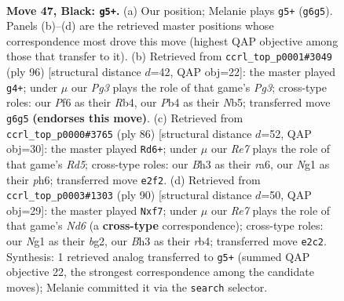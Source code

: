 \documentclass[11pt]{article}
\begin{document}
\clearpage

\begin{figure}[p]\centering
\begin{subfigure}{0.46\textwidth}\centering
\resizebox{\linewidth}{!}{%
\newchessgame
\chessboard[
  setfen={8/7p/3r1ppk/R7/1p2PKP1/7b/4r3/6n1 b - - 0 47},
  showmover=false,
  pgfstyle=straightmove, color=movearrow, markmove={g6-g5}
]}
\caption{}
\end{subfigure}\hfill
\begin{subfigure}{0.46\textwidth}\centering
\resizebox{\linewidth}{!}{%
\newchessgame
\chessboard[
  setfen={2r5/3r4/1p1P3p/1N1Ppk2/1R6/5KP1/5P2/8 w - - 0 49},
  showmover=false,
  pgfstyle=straightmove, color=movearrow, markmove={g3-g4}
]}
\caption{}
\end{subfigure}
\\[4pt]
\begin{subfigure}{0.46\textwidth}\centering
\resizebox{\linewidth}{!}{%
\newchessgame
\chessboard[
  setfen={8/8/rP3k1p/3R2p1/2r3P1/5PK1/6P1/8 w - - 0 44},
  showmover=false,
  pgfstyle=straightmove, color=movearrow, markmove={d5-d6}
]}
\caption{}
\end{subfigure}\hfill
\begin{subfigure}{0.46\textwidth}\centering
\resizebox{\linewidth}{!}{%
\newchessgame
\chessboard[
  setfen={8/5ppk/3N4/5KPP/1rP5/p7/6b1/3R4 w - - 2 46},
  showmover=false,
  pgfstyle=straightmove, color=movearrow, markmove={d6-f7}
]}
\caption{}
\end{subfigure}
\caption{\textbf{Move 47, Black: \texttt{g5+}.} (a) Our position; Melanie plays \texttt{g5+} (\texttt{g6g5}). Panels (b)--(d) are the retrieved master positions whose correspondence most drove this move (highest QAP objective among those that transfer to it). (b) Retrieved from \texttt{ccrl\_top\_p0001\#3049} (ply 96) [structural distance $d$=42, QAP obj=22]: the master played \texttt{g4+}; under $\mu$ our \emph{Pg3} plays the role of that game's \emph{Pg3}; cross-type roles: our \emph{P}f6 as their \emph{R}b4, our \emph{P}b4 as their \emph{N}b5; transferred move \texttt{g6g5} \textbf{(endorses this move)}. (c) Retrieved from \texttt{ccrl\_top\_p0000\#3765} (ply 86) [structural distance $d$=52, QAP obj=30]: the master played \texttt{Rd6+}; under $\mu$ our \emph{Re7} plays the role of that game's \emph{Rd5}; cross-type roles: our \emph{B}h3 as their \emph{r}a6, our \emph{N}g1 as their \emph{p}h6; transferred move \texttt{e2f2}. (d) Retrieved from \texttt{ccrl\_top\_p0003\#1303} (ply 90) [structural distance $d$=50, QAP obj=29]: the master played \texttt{Nxf7}; under $\mu$ our \emph{Re7} plays the role of that game's \emph{Nd6} (a \textbf{cross-type} correspondence); cross-type roles: our \emph{N}g1 as their \emph{b}g2, our \emph{B}h3 as their \emph{r}b4; transferred move \texttt{e2c2}. Synthesis: 1 retrieved analog transferred to \texttt{g5+} (summed QAP objective 22, the strongest correspondence among the candidate moves); Melanie committed it via the \texttt{search} selector.}
\label{fig:thought-m93}
\end{figure}
\end{document}
